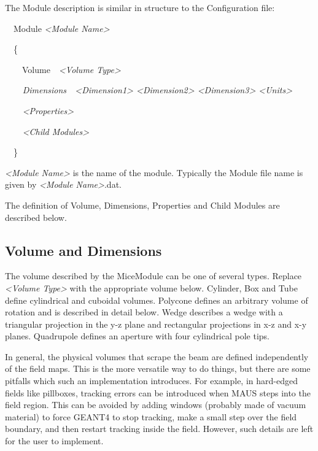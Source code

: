 The Module description is similar in structure to the Configuration file:

{\ttfamily
\ \ Module \textit{{\textless}Module Name{\textgreater}}}

{\ttfamily
\ \ \{}

{\ttfamily
\ \ \ \ Volume\ \ \textit{{\textless}Volume Type{\textgreater}}}

{\ttfamily\itshape
\ \ \ \ \textup{Dimensions\ \ }{\textless}Dimension1{\textgreater} {\textless}Dimension2{\textgreater}
{\textless}Dimension3{\textgreater} {\textless}Units{\textgreater}}

{\ttfamily\itshape
\ \ \ \ {\textless}Properties{\textgreater}}

{\ttfamily\itshape
\ \ \ \ {\textless}Child Modules{\textgreater}}

{\ttfamily
\ \ \}}

\textit{{\textless}Module Name{\textgreater}} is the name of the module. Typically the Module file name is given by
\textit{{\textless}Module Name{\textgreater}}.dat.

The definition of Volume, Dimensions, Properties and Child Modules are described below.

\subsection{Volume and Dimensions}
The volume described by the MiceModule can be one of several types. Replace \textit{{\textless}Volume
Type{\textgreater}} with the appropriate volume below. Cylinder, Box and Tube define cylindrical and cuboidal volumes.
Polycone defines an arbitrary volume of rotation and is described in detail below. Wedge describes a wedge with a
triangular projection in the y-z plane and rectangular projections in x-z and x-y planes. Quadrupole defines an
aperture with four cylindrical pole tips.

In general, the physical volumes that scrape the beam are defined independently of the field maps. This is the more
versatile way to do things, but there are some pitfalls which such an implementation introduces. For example, in
hard-edged fields like pillboxes, tracking errors can be introduced when MAUS steps into the field region. This can
be avoided by adding windows (probably made of vacuum material) to force GEANT4 to stop tracking, make a small step
over the field boundary, and then restart tracking inside the field. However, such details are left for the user to
implement.

